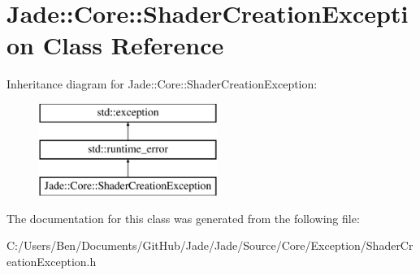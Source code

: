 \hypertarget{class_jade_1_1_core_1_1_shader_creation_exception}{}\section{Jade\+:\+:Core\+:\+:Shader\+Creation\+Exception Class Reference}
\label{class_jade_1_1_core_1_1_shader_creation_exception}
Inheritance diagram for Jade\+:\+:Core\+:\+:Shader\+Creation\+Exception\+:\begin{figure}[H]
\begin{center}
\leavevmode
\includegraphics[height=3.000000cm]{class_jade_1_1_core_1_1_shader_creation_exception}
\end{center}
\end{figure}


The documentation for this class was generated from the following file\+:\begin{DoxyCompactItemize}
\item 
C\+:/\+Users/\+Ben/\+Documents/\+Git\+Hub/\+Jade/\+Jade/\+Source/\+Core/\+Exception/Shader\+Creation\+Exception.\+h\end{DoxyCompactItemize}
